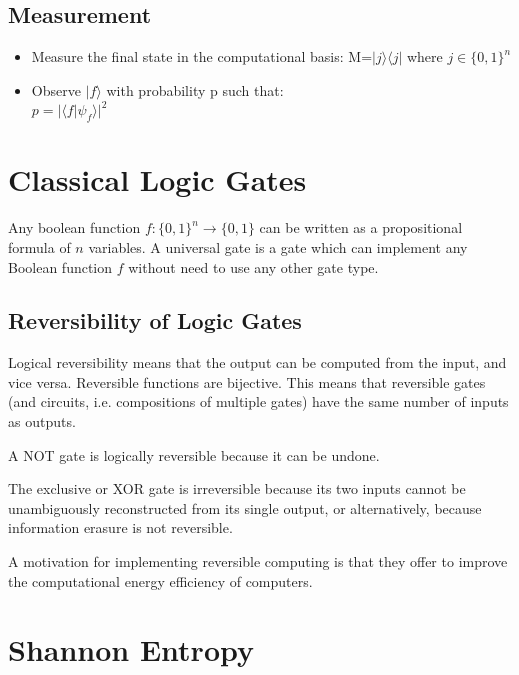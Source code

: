 \documentclass{article}
\begin{document}
\subsection{Measurement}

\begin{itemize}
	\item Measure the final state in the computational basis: M={${|j\rangle\langle j|}$ where ${j\in \{0,1\}^n}$}
\end{itemize}
\begin{itemize}
	\item Observe ${|f\rangle}$ with probability p such that: \\
	      ${p=|\langle f|\psi_f\rangle|^2}$
\end{itemize}


\section{Classical Logic Gates}

Any boolean function $f:\{0,1\}^n \xrightarrow{} \{0,1\} $ can be written as a propositional formula of $n$ variables.
A universal gate is a gate which can implement any Boolean function $f$ without need to use any other gate type.

\subsection{Reversibility of Logic Gates}

Logical reversibility means that the output can be computed from the input, and vice versa. Reversible functions are bijective. This means that reversible gates (and circuits, i.e. compositions of multiple gates) have the same number of inputs as outputs.

A NOT gate is logically reversible because it can be undone.

The exclusive or XOR gate is irreversible because its two inputs cannot be unambiguously reconstructed from its single output, or alternatively, because information erasure is not reversible.

A motivation for implementing reversible computing is that they offer to improve the computational energy efficiency of computers.

\section{Shannon Entropy}
\end{document}
